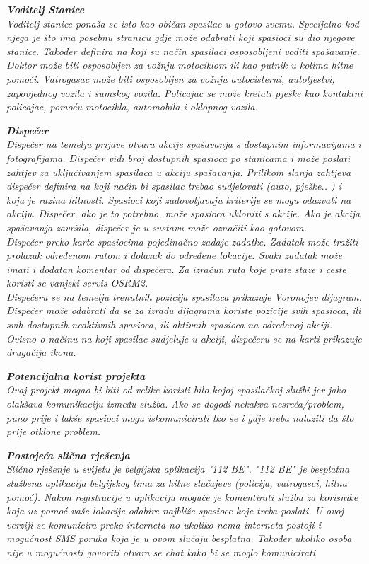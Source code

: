 		\textbf{\textit{Voditelj Stanice}}\\
		\textit{Voditelj stanice ponaša se isto kao običan spasilac u gotovo svemu. Specijalno kod njega je što ima posebnu stranicu gdje može odabrati koji spasioci su dio njegove stanice. Također definira na koji su način spasilaci osposobljeni voditi spašavanje. Doktor može biti osposobljen za vožnju motociklom ili kao putnik u kolima hitne pomoći. Vatrogasac može biti osposobljen za vožnju autocisterni, autoljestvi, zapovjednog vozila i šumskog vozila. Policajac se može kretati pješke kao kontaktni policajac, pomoću motocikla, automobila i oklopnog vozila.}
		
		\textbf{\textit{Dispečer}}\\
		\textit{Dispečer na temelju prijave otvara akcije spašavanja s dostupnim informacijama i fotografijama. Dispečer vidi broj dostupnih spasioca po stanicama i može poslati zahtjev za uključivanjem spasilaca u akciju spašavanja. Prilikom slanja zahtjeva dispečer definira na koji način bi spasilac trebao sudjelovati (auto, pješke.. ) i koja je razina hitnosti. Spasioci koji zadovoljavaju kriterije se mogu odazvati na akciju. Dispečer, ako je to potrebno, može spasioca ukloniti s akcije. Ako je akcija spašavanja završila, dispečer je u sustavu može označiti kao gotovom.\\
		Dispečer preko karte spasiocima pojedinačno zadaje zadatke. Zadatak može tražiti prolazak određenom rutom i dolazak do određene lokacije. Svaki zadatak može imati i dodatan komentar od dispečera. Za izračun ruta koje prate staze i ceste koristi se vanjski servis OSRM2. \\
		Dispečeru se na temelju trenutnih pozicija spasilaca prikazuje Voronojev dijagram. Dispečer može odabrati da se za izradu dijagrama koriste pozicije svih spasioca, ili svih dostupnih neaktivnih spasioca, ili aktivnih spasioca na određenoj akciji. Ovisno o načinu na koji spasilac sudjeluje u akciji, dispečeru se na karti prikazuje drugačija ikona.
		}
	
		\textbf{\textit{Potencijalna korist projekta}}\\
		\textit{Ovaj projekt mogao bi biti od velike koristi bilo kojoj spasilačkoj službi jer jako olakšava komunikaciju između služba. Ako se dogodi nekakva nesreća/problem, puno prije i lakše spasioci mogu iskomunicirati tko se i gdje treba nalaziti da što prije otklone problem.}
		
		\textbf{\textit{Postojeća slična rješenja}}\\
		\textit{ Slično rješenje u svijetu je belgijska aplikacija "112 BE". "112 BE" je besplatna službena aplikacija belgijskog tima za hitne slučajeve (policija, vatrogasci, hitna pomoć). Nakon registracije u aplikaciju moguće je komentirati službu za korisnike koja uz pomoć vaše lokacije odabire najbliže spasioce koje treba poslati. U ovoj verziji se komunicira preko  interneta no ukoliko nema interneta postoji i mogućnost SMS poruka koja je u ovom slučaju besplatna. Također ukoliko osoba nije u mogućnosti govoriti otvara se chat kako bi se moglo komunicirati  }



